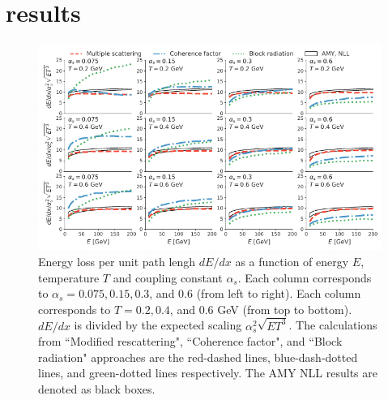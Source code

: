 \documentclass[aps, prc, reprint, amsmath, groupedaddress, nofootinbib]{revtex4-1}
\begin{document}
\section{results}\label{section:results}
\begin{figure}
\includegraphics[width=\textwidth]{Eloss_infinite.pdf}
\caption{Energy loss per unit path lengh $dE/dx$ as a function of energy $E$, temperature $T$ and coupling constant $\alpha_s$. Each column corresponds to $\alpha_s = 0.075, 0.15, 0.3$, and $0.6$ (from left to right). Each column corresponds to $T = 0.2, 0.4$, and $0.6$ GeV (from top to bottom). $dE/dx$ is divided by the expected scaling $\alpha_s^2 \sqrt{ET^3}$. The calculations from ``Modified rescattering", ``Coherence factor", and ``Block radiation" approaches are the red-dashed lines, blue-dash-dotted lines, and green-dotted lines respectively. The AMY NLL results are denoted as black boxes.}
\label{fig:eloss-inf}
\end{figure}
\end{document}
